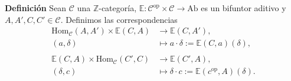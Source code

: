 \documentclass[preview]{standalone}
\begin{document}
\begin{center}
\flushleft \textbf{Definición} Sean $\mathscr{C}$ una $\mathbb{Z}$-categoría, $\mathbb{E}:\mathscr{C}^\text{op}\times\mathscr{C}\to\text{Ab}$ es un bifuntor aditivo y $A,A',C,C'\in\mathscr{C}$. Definimos las correspondencias \begin{align*} \text{Hom}_\mathscr{C}(A,A')\times\mathbb{E}(C,A) &\to \mathbb{E}(C,A'), \\ (a,\delta) &\mapsto a\cdot\delta:=\mathbb{E}(C,a)(\delta), \\ \\ \mathbb{E}(C,A)\times\text{Hom}_\mathscr{C}(C',C) &\to \mathbb{E}(C',A), \\ (\delta,c) &\mapsto \delta\cdot c:=\mathbb{E}(c^\text{op},A)(\delta). \end{align*}
\end{center}
\end{document}
